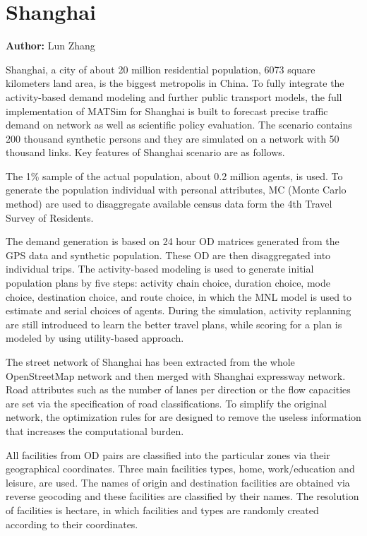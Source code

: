 \section{Shanghai}
\label{sec:shanghai}
\hfill \textbf{Author:} Lun Zhang

Shanghai, a city of about 20 million residential population, 6073 square kilometers land area, is the biggest metropolis in China. To fully integrate the activity-based demand modeling and further public transport models, the full implementation of MATSim for Shanghai is built to forecast precise traffic demand on network as well as scientific policy evaluation. The scenario contains 200 thousand synthetic persons and they are simulated on a network with 50 thousand links. Key features of Shanghai scenario are as follows.

The 1\% sample of the actual population, about 0.2 million agents, is used. To generate the population individual with personal attributes, MC (Monte Carlo method) are used to disaggregate available census data form the 4th Travel Survey of Residents.

The demand generation is based on 24 hour OD matrices generated from the GPS data and synthetic population. These OD are then disaggregated into individual trips. The activity-based modeling is used to generate initial population plans by five steps: activity chain choice, duration choice, mode choice, destination choice, and route choice, in which the MNL model is used to estimate and serial choices of agents. During the simulation, activity replanning are still introduced to learn the better travel plans, while scoring for a plan is modeled by using utility-based approach.

The street network of Shanghai has been extracted from the whole OpenStreetMap network and then merged with Shanghai expressway network. Road attributes such as the number of lanes per direction or the flow capacities are set via the specification of road classifications. To simplify the original network, the optimization rules for are designed to remove the useless information that increases the computational burden.

All facilities from OD pairs are classified into the particular zones via their geographical coordinates. Three main facilities types, home, work/education and leisure, are used. The names of origin and destination facilities are obtained via reverse geocoding and these facilities are classified by their names. The resolution of facilities is hectare, in which facilities and types are randomly created according to their coordinates.


